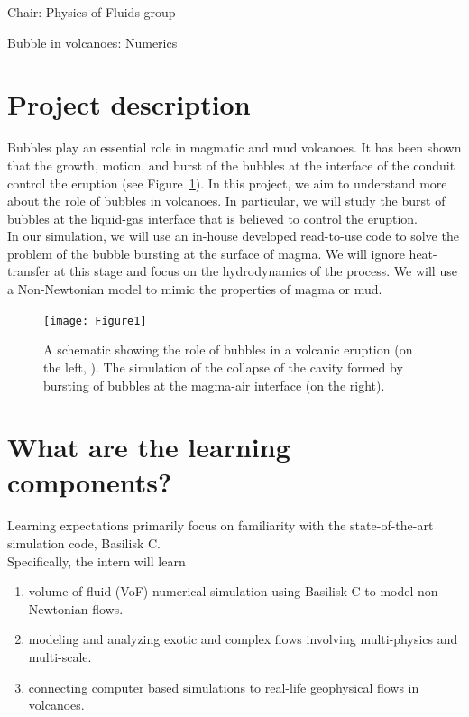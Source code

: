\documentclass[a4paper,10pt]{article}
\begin{document}
\noindent Chair: Physics of Fluids group
\begin{center}
 \begin{LARGE}
  Bubble in volcanoes: Numerics
 \end{LARGE}
\end{center}

\section*{Project description}
Bubbles play an essential role in magmatic and mud volcanoes. It has been shown that the growth, motion, and burst of the bubbles at the interface of the conduit control the eruption (see Figure~\ref{Figure::Typical}). In this project, we aim to understand more about the role of bubbles in volcanoes. In particular, we will study the burst of bubbles at the liquid-gas interface that is believed to control the eruption.\\
In our simulation, we will use an in-house developed read-to-use code to solve the problem of the bubble bursting at the surface of magma. We will ignore heat-transfer at this stage and focus on the hydrodynamics of the process. We will use a Non-Newtonian model to mimic the properties of magma or mud.

\begin{figure}[H]
\begin{center}
 \texttt{[image: Figure1]}
 \caption{A schematic showing the role of bubbles in a volcanic eruption (on the left,  \cite{gonnermann2007fluid}). The simulation of the collapse of the cavity formed by bursting of bubbles at the magma-air interface (on the right).}
 \label{Figure::Typical}
\end{center}
\end{figure}

\section*{What are the learning components?}
Learning expectations primarily focus on familiarity with the state-of-the-art simulation code, Basilisk C.\\

\noindent Specifically, the intern will learn

\begin{enumerate}
	\item volume of fluid (VoF) numerical simulation using Basilisk C to model non-Newtonian flows.
	\item modeling and analyzing exotic and complex flows involving multi-physics and multi-scale. 
	\item connecting computer based simulations to real-life geophysical flows in volcanoes. 
\end{enumerate}
\end{document}
